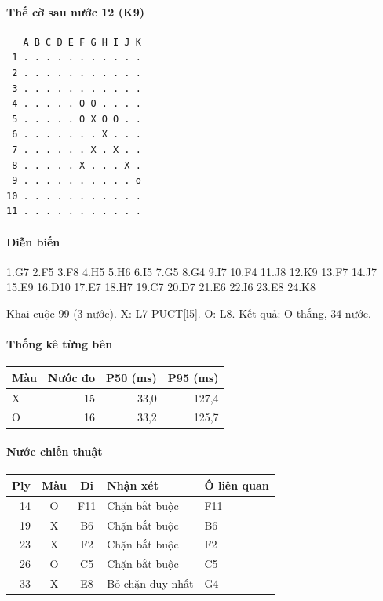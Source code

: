 \paragraph{Thế cờ sau nước 12 (K9)}
\begin{verbatim}
   A B C D E F G H I J K
 1 . . . . . . . . . . .
 2 . . . . . . . . . . .
 3 . . . . . . . . . . .
 4 . . . . . O O . . . .
 5 . . . . . O X O O . .
 6 . . . . . . . X . . .
 7 . . . . . . X . X . .
 8 . . . . . X . . . X .
 9 . . . . . . . . . . o
10 . . . . . . . . . . .
11 . . . . . . . . . . .
\end{verbatim}
\paragraph{Diễn biến}
{\footnotesize 1.G7 2.F5 3.F8 4.H5 5.H6 6.I5 7.G5 8.G4 9.I7 10.F4 11.J8 12.K9 13.F7 14.J7 15.E9 16.D10 17.E7 18.H7 19.C7 20.D7 21.E6 22.I6 23.E8 24.K8\par}
Khai cuộc 99 (3 nước). X: L7-PUCT[l5]. O: L8. Kết quả: O thắng, 34 nước.
\paragraph{Thống kê từng bên}
\begin{center}\small
\begin{tabular}{@{}lrrr@{}}
\toprule
Màu & Nước đo & P50 (ms) & P95 (ms) \\
\midrule
X & 15 & 33,0 & 127,4 \\
O & 16 & 33,2 & 125,7 \\
\bottomrule
\end{tabular}
\end{center}
\paragraph{Nước chiến thuật}
\begin{center}\small
\begin{tabular}{@{}rccll@{}}
\toprule
Ply & Màu & Đi & Nhận xét & Ô liên quan \\
\midrule
14 & O & F11 & Chặn bắt buộc & F11 \\
19 & X & B6 & Chặn bắt buộc & B6 \\
23 & X & F2 & Chặn bắt buộc & F2 \\
26 & O & C5 & Chặn bắt buộc & C5 \\
33 & X & E8 & Bỏ chặn duy nhất & G4 \\
\bottomrule
\end{tabular}
\end{center}
